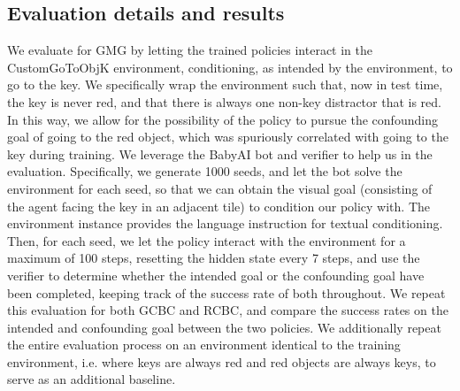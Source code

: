 \documentclass[../main.tex]{subfiles}
\begin{document}
\subsection{Evaluation details and results}

We evaluate for GMG by letting the trained policies interact in the CustomGoToObjK environment,
conditioning, as intended by the environment, to go to the key. We specifically wrap the environment
such that, now in test time, the key is never red, and that there is always one non-key distractor
that is red. In this way, we allow for the possibility of the policy to pursue the confounding goal
of going to the red object, which was spuriously correlated with going to the key during training.
We leverage the BabyAI bot and verifier to help us in the evaluation. Specifically, we generate 1000
seeds, and let the bot solve the environment for each seed, so that we can obtain the visual goal
(consisting of the agent facing the key in an adjacent tile) to condition our policy with. The
environment instance provides the language instruction for textual conditioning. Then, for each
seed, we let the policy interact with the environment for a maximum of 100 steps, resetting the
hidden state every 7 steps, and use the verifier to determine whether the intended goal or the
confounding goal have been completed, keeping track of the success rate of both throughout. We
repeat this evaluation for both GCBC and RCBC, and compare the success rates on the intended and
confounding goal between the two policies. We additionally repeat the entire evaluation process on
an environment identical to the training environment, i.e. where keys are always red and red objects
are always keys, to serve as an additional baseline.
\end{document}
